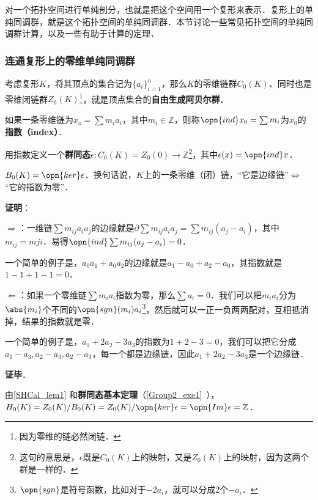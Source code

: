 

对一个拓扑空间进行单纯剖分，也就是把这个空间用一个复形来表示．复形上的单纯同调群，就是这个拓扑空间的单纯同调群．本节讨论一些常见拓扑空间的单纯同调群计算，以及一些有助于计算的定理．

\subsubsection{连通复形上的零维单纯同调群}

考虑复形$K$，将其顶点的集合记为$\{a_i\}_{i=1}^n$，那么$K$的零维链群$C_0(K)$、同时也是零维闭链群$Z_0(K)$\footnote{因为零维的链必然闭链．}，就是顶点集合的\textbf{自由生成阿贝尔群}．

如果一条零维链为$x_o=\sum m_ia_i$，其中$m_i\in\mathbb{Z}$，则称$\opn{ind} x_0=\sum m_i$为$x_0$的\textbf{指数（index）}．

用指数定义一个\textbf{群同态}$\epsilon: C_0(K)=Z_0(0)\to\mathbb{Z}$\footnote{这句的意思是，$\epsilon$既是$C_0(K)$上的映射，又是$Z_0(K)$上的映射，因为这两个群是一样的．}，其中$\epsilon(x)=\opn{ind} x$．

\begin{lemma}{}\label{SHCal_lem1}
$B_0(K)=\opn{ker}\epsilon$．换句话说，$K$上的一条零维（闭）链，“它是边缘链”$\iff$“它的指数为零”．
\end{lemma}

\textbf{证明}：

$\Rightarrow$：一维链$\sum m_{ij}a_ia_j$的边缘就是$\partial\sum m_{ij}a_ia_j=\sum m_{ij}(a_j-a_i)$，其中$m_{ij}=m{ji}$．易得$\opn{ind}\sum m_{ij}(a_j-a_i)=0$．

一个简单的例子是，$a_0a_1+a_0a_2$的边缘就是$a_1-a_0+a_2-a_0$，其指数就是$1-1+1-1=0$．


$\Leftarrow$：如果一个零维链$\sum m_ia_i$指数为零，那么$\sum a_i=0$．我们可以把$m_ia_i$分为$\abs{m_i}$个不同的$\opn{sgn}(m_i)a_i$\footnote{$\opn{sgn}$是符号函数，比如对于$-2a_i$，就可以分成$2$个$-a_i$．}，然后就可以一正一负两两配对，互相抵消掉，结果的指数就是零．

一个简单的例子是，$a_1+2a_2-3a_3$的指数为$1+2-3=0$，我们可以把它分成$a_1-a_3, a_2-a_3, a_2-a_3$，每一个都是边缘链，因此$a_1+2a_2-3a_3$是一个边缘链．

\textbf{证毕}．

由\autoref{SHCal_lem1} 和\textbf{群同态基本定理}（\autoref{Group2_exe1}~），$H_0(K)=Z_0(K)/B_0(K)=Z_0(K)/\opn{ker}\epsilon=\opn{Im}\epsilon=\mathbb{Z}$．



